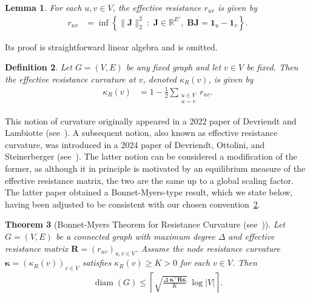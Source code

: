 \documentclass[11pt,a4paper]{amsart}
\newcommand{\diam}{\operatorname{diam}}
\newcommand{\resistance}[1]{\kappa_R\left({#1}\right)}
\newtheorem{theorem}{Theorem}[section]
\newtheorem{definition}[theorem]{Definition}
\newtheorem{lemma}[theorem]{Lemma}
\begin{document}
\begin{lemma}\label{prop:flow-resistance}
    For each $u, v\in V$, the effective resistance $r_{uv}$ is given by
        \begin{align*}
            r_{uv} &= \inf\left\{\|\mathbf{J}\|_2^2 \;:\;\mathbf{J}\in\mathbb{R}^{E'},\;  \mathbf{B}\mathbf{J} = \mathbf{1}_{u} - \mathbf{1}_{v}\right\}.
        \end{align*}
\end{lemma}

Its proof is straightforward linear algebra and is omitted.

\begin{definition}\label{defn:curvature-resistance}
    Let $G=(V, E)$ be any fixed graph and let $v\in V$ be fixed. Then the {\normalfont effective resistance curvature} at $v$, denoted $\resistance{v}$, is given by
        \begin{align*}
            \resistance{v} &= 1- \frac{1}{2}\sum_{\substack{u\in V\\ u\sim v}} r_{uv}.
        \end{align*}   
\end{definition}

This notion of curvature originally appeared in a 2022 paper of Devriendt and Lambiotte (see~\cite{DL}). A subsequent notion, also known as effective resistance curvature, was introduced in a 2024 paper of Devriendt, Ottolini, and Steinerberger (see~\cite{DOS}). The latter notion can be considered a modification of the former, as although it in principle is motivated by an equilibrium measure of the effective resistance matrix, the two are the same up to a global scaling factor. The latter paper obtained a Bonnet-Myers-type result, which we state below, having been adjusted to be consistent with our chosen convention~\cref{defn:curvature-resistance}.

\begin{theorem}[Bonnet-Myers Theorem for Resistance Curvature (see~\cite{DOS})]
    Let $G=(V,E)$ be a connected graph with maximum degree $\Delta$ and effective resistance matrix $\mathbf{R} = (r_{uv})_{u, v\in V}$. Assume the node resistance curvature $\boldsymbol{\kappa} = (\resistance{v})_{v\in V}$ satisfies $\resistance{v} \geq K > 0$ for each $v\in V$. Then
        \begin{align*}
            \diam(G)\leq \left\lceil \sqrt{\frac{\Delta\; \boldsymbol{\kappa}^\top\mathbf{R}\boldsymbol{\kappa}}{K}}\;\log|V|  \right\rceil.
        \end{align*}
\end{theorem}
\end{document}
